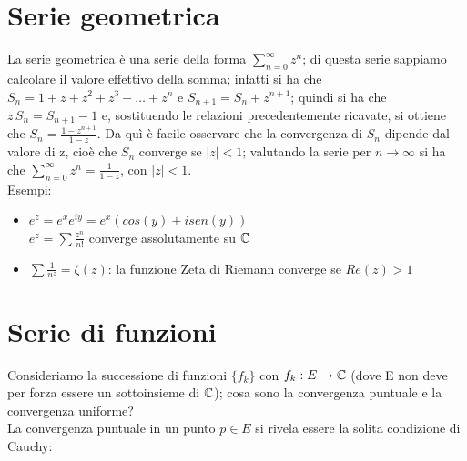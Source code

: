 \section{Serie geometrica}

La serie geometrica è una serie della forma $\sum_{n=0} ^{\infty} z^n$; di questa serie sappiamo calcolare il valore effettivo della somma; infatti si ha che $S_n=1+z+z^2+z^3+ \dots +z^n$ e $S_{n+1}=S_n + z^{n+1}$; quindi si ha che $z \, S_n=S_{n+1} -1$ e, sostituendo le relazioni precedentemente ricavate, si ottiene che $S_n=\frac{1-z^{n+1}}{1-z}$. Da quì è facile osservare che la convergenza di $S_n$ dipende dal valore di z, cioè che $S_n$ converge se $|z|<1$; valutando la serie per $n \to \infty$ si ha che $\sum_{n=0} ^{\infty} z^n=\frac{1}{1-z}$, con $|z|<1$.
\\Esempi:
\begin{itemize}
\item $e^z =e^x e^{iy}=e^x (cos(y)+i sen(y))$ \\$e^z=\sum \frac{z^n}{n!}$ converge assolutamente su $\mathbb{C}$
\item $\sum \frac{1}{n^z} = \zeta(z)$: la funzione Zeta di Riemann converge se $Re(z)>1$
\end{itemize}

\section{Serie di funzioni}

Consideriamo la successione di funzioni $\{f_k\}$ con $f_k:E \to \mathbb{C}$ (dove E non deve per forza essere un sottoinsieme di $\mathbb{C}$); cosa sono la convergenza puntuale e la convergenza uniforme? \\La convergenza puntuale in un punto $p \in E$ si rivela essere la solita condizione di Cauchy:

